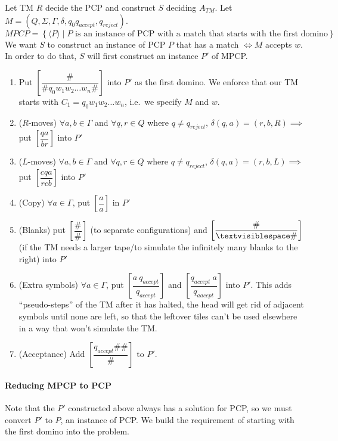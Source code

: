 \documentclass[12 pt]{article}
\begin{document}
Let TM $R$ decide the PCP and construct $S$ deciding $A_{TM}$. Let $M
= (Q, \Sigma, \Gamma, \delta, q_0 q_{accept}, q_{reject})$.
\\ $MPCP =  \left\{\langle P \rangle \mid P \text{ is an instance of
    PCP with a match that starts with the first domino}\right\}$
\\ We want $S$ to construct an instance of PCP $P$ that has a match
$\iff M$ accepts $w$. In order to do that, $S$ will first construct an
instance $P'$ of MPCP.
\begin{enumerate}
\item Put $\left[\dfrac{\#}{\# q_0 w_1 w_2 \ldots w_n \#}\right]$ into
  $P'$ as the first domino. We enforce that our TM starts with $C_1 =
  q_0 w_1w_2 \ldots w_n$, i.e.\ we specify $M$ and $w$.
\item ($R$-moves) $\forall a,b \in \Gamma$ and $\forall q,r \in Q$
  where $q \neq q_{reject}$, $\delta(q,a) = (r,b,R) \implies$ put
  $\left[\dfrac{qa}{br}\right]$ into $P'$
\item ($L$-moves) $\forall a,b \in \Gamma$ and $\forall q,r \in Q$
  where $q \neq q_{reject}$, $\delta(q,a) = (r,b,L) \implies$ put
  $\left[\dfrac{cqa}{rcb}\right]$ into $P'$
\item (Copy) $\forall a \in \Gamma$, put $\left[\dfrac{a}{a}\right]$
  in $P'$
\item (Blanks) put $\left[\dfrac{\#}{\#}\right]$ (to separate
  configurations) and $\left[\dfrac{\#}{\textvisiblespace\#}\right]$
  (if the TM needs a larger tape/to simulate the infinitely many
  blanks to the right) into $P'$
\item (Extra symbols) $\forall a \in \Gamma$, put $\left[\dfrac{a\
      q_{accept}}{q_{accept}}\right]$ and $\left[\dfrac{q_{accept}\
      a}{q_{aacept}}\right]$ into $P'$. This adds ``pseudo-steps'' of
  the TM after it has halted, the head will get rid of adjacent
  symbols until none are left, so that the leftover tiles can't be
  used elsewhere in a way that won't simulate the TM.
\item (Acceptance) Add $\left[\dfrac{q_{accept}\#\#}{\#}\right]$ to $P'$.
\end{enumerate}
\paragraph{Reducing MPCP to PCP} Note that the $P'$ constructed above
always has a solution for PCP, so we must convert $P'$ to $P$, an
instance of PCP. We build the requirement of starting with the first
domino into the problem.
\end{document}
